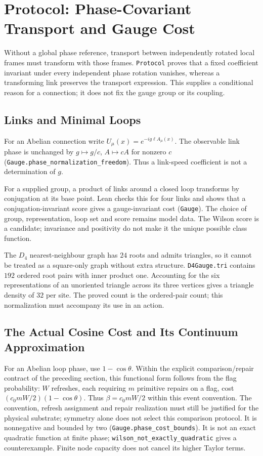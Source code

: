 \section{Protocol: Phase-Covariant Transport and Gauge Cost}
\label{sec:protocol}

Without a global phase reference, transport between independently rotated local frames must transform with those frames. \nolinkurl{Protocol} proves that a fixed coefficient invariant under every independent phase rotation vanishes, whereas a transforming link preserves the transport expression. This supplies a conditional reason for a connection; it does not fix the gauge group or its coupling.

\subsection{Links and Minimal Loops}
For an Abelian connection write $U_\mu(x)=e^{-ig\ell A_\mu(x)}$. The observable link phase is unchanged by $g\mapsto g/c$, $A\mapsto cA$ for nonzero $c$ (\nolinkurl{Gauge.phase_normalization_freedom}). Thus a link-speed coefficient is not a determination of $g$.

For a supplied group, a product of links around a closed loop transforms by conjugation at its base point. Lean checks this for four links and shows that a conjugation-invariant score gives a gauge-invariant cost (\nolinkurl{Gauge}). The choice of group, representation, loop set and score remains model data. The Wilson score is a candidate; invariance and positivity do not make it the unique possible class function.

The $D_4$ nearest-neighbour graph has $24$ roots and admits triangles, so it cannot be treated as a square-only graph without extra structure. \nolinkurl{D4Gauge.tri} contains $192$ ordered root pairs with inner product one. Accounting for the six representations of an unoriented triangle across its three vertices gives a triangle density of $32$ per site. The proved count is the ordered-pair count; this normalization must accompany its use in an action.

\subsection{The Actual Cosine Cost and Its Continuum Approximation}
\label{sec:exact_truncation}
For an Abelian loop phase, use $1-\cos\theta$. Within the explicit comparison/repair
contract of the preceding section, this functional form follows from the flag probability:
$W$ refreshes, each requiring $m$ primitive repairs on a flag, cost
$(c_0mW/2)(1-\cos\theta)$. Thus $\beta=c_0mW/2$ within this event convention.
The convention, refresh assignment and repair realization must still be justified for the
physical substrate; symmetry alone does not select this comparison protocol. It is nonnegative and bounded by two (\nolinkurl{Gauge.phase_cost_bounds}). It is not an exact quadratic function at finite phase; \nolinkurl{wilson_not_exactly_quadratic} gives a counterexample. Finite node capacity does not cancel its higher Taylor terms.

